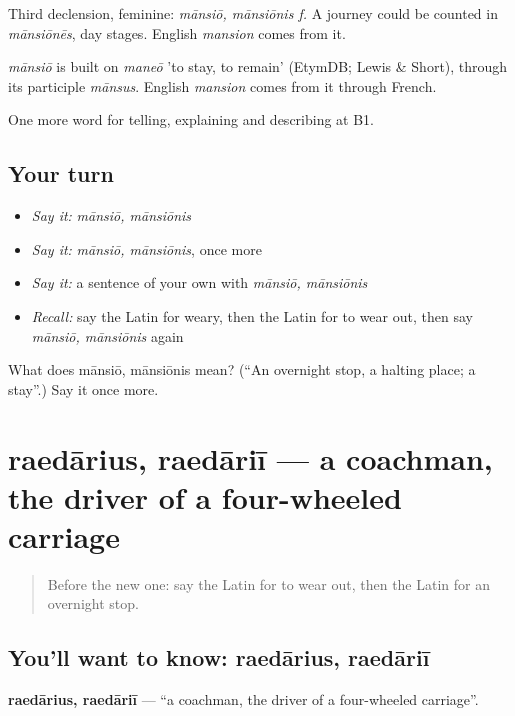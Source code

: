 Third declension, feminine: \emph{mānsiō, mānsiōnis f.} A journey could be counted in \emph{mānsiōnēs}, day stages. English \emph{mansion} comes from it.

\begin{cousinweb}
\emph{mānsiō} is built on \emph{maneō} 'to stay, to remain' (EtymDB; Lewis \& Short), through its participle \emph{mānsus}. English \emph{mansion} comes from it through French.
\end{cousinweb}

\begin{grammarlens}[title={What you've built}]
One more word for telling, explaining and describing at B1.
\end{grammarlens}

\subsection*{Your turn}
\begin{itemize}
\raggedright
  \item \emph{Say it:} \emph{mānsiō, mānsiōnis}
  \item \emph{Say it:} \emph{mānsiō, mānsiōnis}, once more
  \item \emph{Say it:} a sentence of your own with \emph{mānsiō, mānsiōnis}
  \item \emph{Recall:} say the Latin for weary, then the Latin for to wear out, then say \emph{mānsiō, mānsiōnis} again
\end{itemize}

\begin{tcolorbox}[breakable,colback=teal!4,colframe=teal!35!black,title={Before you move on}]
What does mānsiō, mānsiōnis mean? (\textquotedblleft{}An overnight stop, a halting place; a stay\textquotedblright{}.) Say it once more.
\end{tcolorbox}
\section[raedārius, raedāriī]{raedārius, raedāriī — a coachman, the driver of a four-wheeled carriage}

\label{lesson:LA-C427-raedarius}



\begin{quote}
Before the new one: say the Latin for to wear out, then the Latin for an overnight stop.
\end{quote}

\subsection*{You'll want to know: raedārius, raedāriī}
\textbf{raedārius, raedāriī} — \textquotedblleft{}a coachman, the driver of a four-wheeled carriage\textquotedblright{}.


